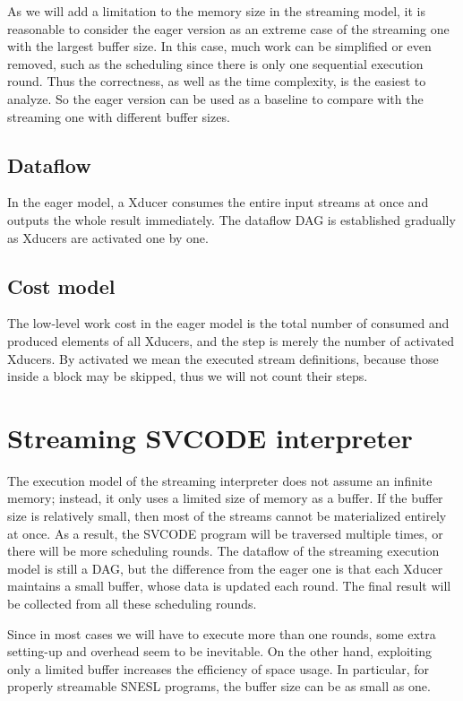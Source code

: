 As we will add a limitation to the memory size in the streaming model, it is reasonable to consider the eager version as an extreme case  of the streaming one with the largest buffer size. 
In this case, much work can be simplified or even removed, such as the scheduling since there is only one sequential execution round. 
Thus the correctness, as well as the time complexity, is the easiest to analyze. 
So the eager version can be used as a baseline to compare with the streaming one with different buffer sizes.


\subsection{Dataflow}
In the eager model, a Xducer consumes the entire input streams at once and outputs the whole result immediately. 
The dataflow DAG is established gradually as Xducers are activated one by one.   


\subsection{Cost model}
The low-level work cost in the eager model is the total number of consumed and produced elements of all Xducers, and the step is merely the number of activated Xducers. 
By activated we mean the executed stream definitions, because those inside a \wc block may be skipped, thus we will not count their steps. 



\section{Streaming SVCODE interpreter}

The execution model of the streaming interpreter does not assume an infinite memory; instead, it only uses a limited size of memory as a buffer. 
If the buffer size is relatively small, then most of the streams cannot be materialized entirely at once. 
As a result, the SVCODE program will be traversed multiple times, or there will be more scheduling rounds. 
The dataflow of the streaming execution model is still a DAG, but the difference from the eager one is that each Xducer maintains a small buffer, whose data is updated each round. 
The final result will be collected from all these scheduling rounds.


Since in most cases we will have to execute more than one rounds, some extra setting-up and overhead seem to be inevitable.
On the other hand, exploiting only a limited buffer increases the efficiency of space usage. 
In particular, for properly streamable SNESL programs, the buffer size can be as small as one.


